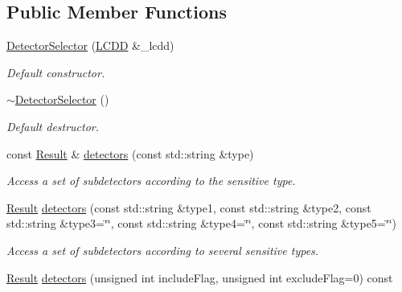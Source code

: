 \subsection*{Public Member Functions}
\begin{DoxyCompactItemize}
\item 
\hyperlink{class_d_d4hep_1_1_geometry_1_1_detector_selector_a683570559af13a80725cf14d8c3cd4b6}{Detector\+Selector} (\hyperlink{class_d_d4hep_1_1_geometry_1_1_l_c_d_d}{L\+C\+DD} \&\+\_\+lcdd)
\begin{DoxyCompactList}\small\item\em Default constructor. \end{DoxyCompactList}\item 
\hyperlink{class_d_d4hep_1_1_geometry_1_1_detector_selector_a20dcfab3e2fb33672b347aa4fdcea393}{$\sim$\+Detector\+Selector} ()
\begin{DoxyCompactList}\small\item\em Default destructor. \end{DoxyCompactList}\item 
const \hyperlink{class_d_d4hep_1_1_geometry_1_1_detector_selector_a6ce0dfe8c83f5d36138244218f260ed1}{Result} \& \hyperlink{class_d_d4hep_1_1_geometry_1_1_detector_selector_a81f9787f4e1d4a0ce5ba2f5cd379b7c5}{detectors} (const std\+::string \&type)
\begin{DoxyCompactList}\small\item\em Access a set of subdetectors according to the sensitive type. \end{DoxyCompactList}\item 
\hyperlink{class_d_d4hep_1_1_geometry_1_1_detector_selector_a6ce0dfe8c83f5d36138244218f260ed1}{Result} \hyperlink{class_d_d4hep_1_1_geometry_1_1_detector_selector_ab4d3e85afb6df129d15ae55a09ca1c3f}{detectors} (const std\+::string \&type1, const std\+::string \&type2, const std\+::string \&type3=\char`\"{}\char`\"{}, const std\+::string \&type4=\char`\"{}\char`\"{}, const std\+::string \&type5=\char`\"{}\char`\"{})
\begin{DoxyCompactList}\small\item\em Access a set of subdetectors according to several sensitive types. \end{DoxyCompactList}\item 
\hyperlink{class_d_d4hep_1_1_geometry_1_1_detector_selector_a6ce0dfe8c83f5d36138244218f260ed1}{Result} \hyperlink{class_d_d4hep_1_1_geometry_1_1_detector_selector_a41570aef7735a6914c4e7e3f067f6fab}{detectors} (unsigned int include\+Flag, unsigned int exclude\+Flag=0) const
\end{DoxyCompactItemize}
